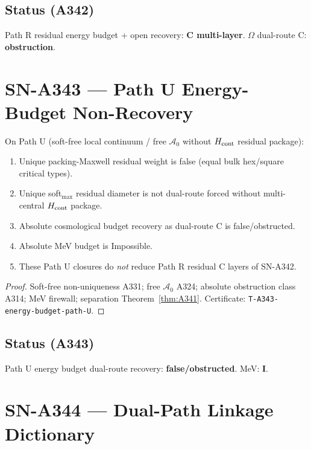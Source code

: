 \subsection*{Status (A342)}
Path R residual energy budget + open recovery: \textbf{C multi-layer}. $\Omega$ dual-route C: \textbf{obstruction}.

\section{SN-A343 --- Path U Energy-Budget Non-Recovery}
\label{sec:SN-A343}

\begin{theorem}
\label{thm:A343}
On Path U (soft-free local continuum / free $\mathcal{A}_0$ without $H_{\rm cont}$ residual package):
\begin{enumerate}[label=(\roman*)]
\item Unique packing-Maxwell residual weight is false (equal bulk hex/square critical types).
\item Unique soft$_{\max}$ residual diameter is not dual-route forced without multi-central $H_{\rm cont}$ package.
\item Absolute cosmological budget recovery as dual-route C is false/obstructed.
\item Absolute MeV budget is Impossible.
\item These Path U closures do \emph{not} reduce Path R residual C layers of SN-A342.
\end{enumerate}
\end{theorem}

\begin{proof}
Soft-free non-uniqueness A331; free $\mathcal{A}_0$ A324; absolute obstruction class A314; MeV firewall; separation Theorem~\ref{thm:A341}. Certificate: \texttt{T-A343-energy-budget-path-U}.
\end{proof}

\subsection*{Status (A343)}
Path U energy budget dual-route recovery: \textbf{false/obstructed}. MeV: \textbf{I}.

\section{SN-A344 --- Dual-Path Linkage Dictionary}
\label{sec:SN-A344}


